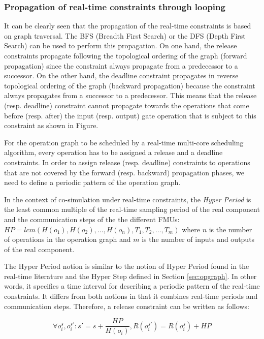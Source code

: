 \subsubsection{Propagation of real-time constraints through looping}

It can be clearly seen that the propagation of the real-time constraints is based on graph traversal. The BFS (Breadth First Search) or the DFS (Depth First Search) can be used to perform this propagation. On one hand, the release constraints propagate following the topological ordering of the graph (forward propagation) since the constraint always propagate from a predecessor to a successor. On the other hand, the deadline constraint propagates in reverse topological ordering of the graph (backward propagation) because the constraint always propagates from a successor to a predecessor. This means that the release (resp. deadline) constraint cannot propagate towards the operations that come before (resp. after) the input (resp. output) gate operation that is subject to this constraint as shown in Figure.

For the operation graph to be scheduled by a real-time multi-core scheduling algorithm, every operation has to be assigned a release and a deadline constraints. In order to assign release (resp. deadline) constraints to operations that are not covered by the forward (resp. backward) propagation phases, we need to define a periodic pattern of the operation graph.

\begin{definition}
In the context of co-simulation under real-time constraints, the \textit{Hyper Period} is the least common multiple of the real-time sampling period of the real component and the communication steps of the the different FMUs: $HP=lcm(H(o_1),H(o_2), \dots ,\allowbreak H(o_n), T_1, T_2, \dots ,T_m)$ where $n$ is the number of operations in the operation graph and $m$ is the number of inputs and outputs of the real component.
\label{def:hyperperiod}
\end{definition}

The Hyper Period notion is similar to the notion of Hyper Period found in the real-time literature and the Hyper Step defined in Section \ref{sec:opgraph}. In other words, it specifies a time interval for describing a periodic pattern of the real-time constraints. It differs from both notions in that it combines real-time periods and communication steps. Therefore, a release constraint can be written as follows:

\begin{equation}
\forall o_i^s, o_i^{s'}: s' = s + \frac{HP}{H(o_i)}, R(o_i^{s'}) = R(o_i^s) + HP
\label{eq:release}
\end{equation}

